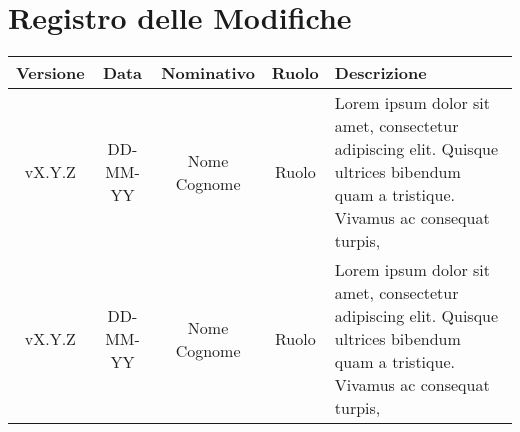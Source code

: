 \section*{\Large Registro delle Modifiche}
    \begin{table}[h]
        \centering
        \renewcommand\tabularxcolumn[1]{m{#1}} %
        \renewcommand{\arraystretch}{1.5}
        \begin{tabularx}{0.98\textwidth}
            {c|c|c|c|>{\centering\arraybackslash}X}
            \rowcolor{black}
            \textbf{\color{white} Versione} & \textbf{\color{white} Data} & \textbf{\color{white} Nominativo} & \textbf{\color{white} Ruolo} & \textbf{\color{white} Descrizione} \\ 
            \hline

            vX.Y.Z & DD-MM-YY & Nome Cognome & Ruolo & Lorem ipsum dolor sit amet, consectetur adipiscing elit. Quisque ultrices bibendum quam a tristique. Vivamus ac consequat turpis, \\
            vX.Y.Z & DD-MM-YY & Nome Cognome & Ruolo & Lorem ipsum dolor sit amet, consectetur adipiscing elit. Quisque ultrices bibendum quam a tristique. Vivamus ac consequat turpis, \\
            \hline
        \end{tabularx}
    \end{table}
